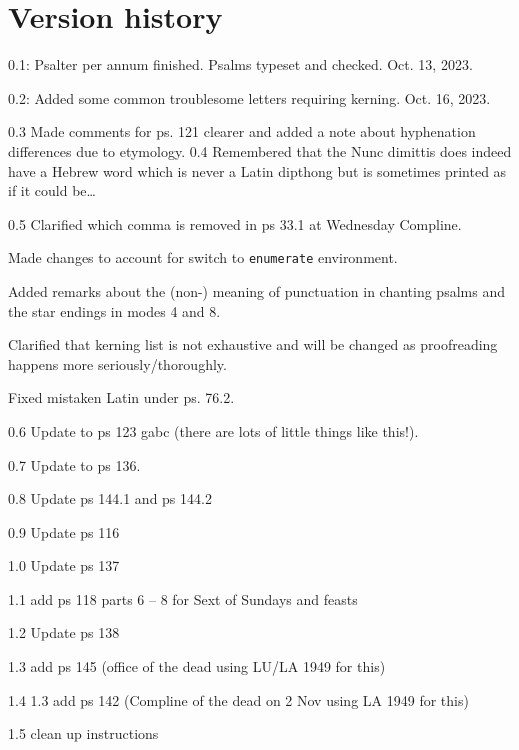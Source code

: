 \documentclass[11pt]{article}
\begin{document}
  \section{Version history}
0.1: Psalter per annum finished. Psalms typeset and checked. Oct. 13, 2023.

0.2: Added some common troublesome letters requiring kerning. Oct. 16, 2023. 

0.3 Made comments for ps. 121 clearer and added a note about hyphenation differences due to etymology.
0.4 Remembered that the Nunc dimittis does indeed have a Hebrew word which is never a Latin dipthong but is sometimes printed as if it could be…

0.5 Clarified which comma is removed in ps 33.1 at Wednesday Compline. 

Made changes to account for switch to \verb|enumerate| environment.

Added remarks about the (non-) meaning of punctuation in chanting psalms and the star endings in modes 4 and 8.

Clarified that kerning list is not exhaustive and will be changed as proofreading happens more seriously/thoroughly.

Fixed mistaken Latin under ps. 76.2.

0.6 Update to ps 123 gabc (there are lots of little things like this!).

0.7 Update to ps 136.

0.8 Update ps 144.1 and ps 144.2

0.9 Update ps 116

1.0 Update ps 137

1.1 add ps 118 parts 6 – 8 for Sext of Sundays and feasts

1.2 Update ps 138

1.3 add ps 145 (office of the dead using LU/LA 1949 for this)

1.4 1.3 add ps 142 (Compline of the dead on 2 Nov using LA 1949 for this)

1.5 clean up instructions
\end{document}
